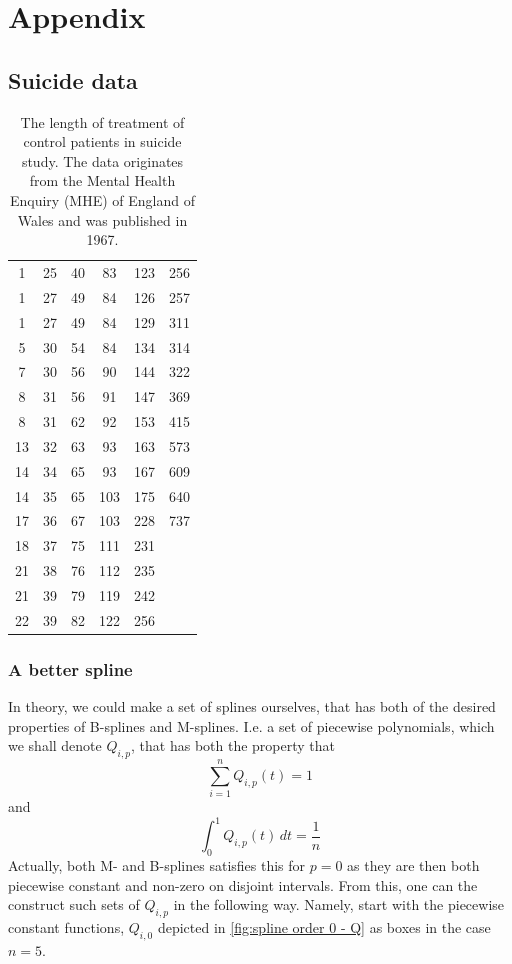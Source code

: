 \documentclass[../Thesis.tex]{subfiles}
\begin{document}
\chapter{Appendix}

\section{Suicide data}
\begin{table}[H]
    \centering
    \begin{tabular}{cccccc}
1 & 25 & 40 & 83 & 123 & 256 \\
1 & 27 & 49 & 84 & 126 & 257 \\
1 & 27 & 49 & 84 & 129 & 311 \\
5 & 30 & 54 & 84 & 134 & 314 \\
7 & 30 & 56 & 90 & 144 & 322 \\
8 & 31 & 56 & 91 & 147 & 369 \\
8 & 31 & 62 & 92 & 153 & 415 \\
13 & 32 & 63 & 93 & 163 & 573 \\
14 & 34 & 65 & 93 & 167 & 609 \\
14 & 35 & 65 & 103 & 175 & 640 \\
17 & 36 & 67 & 103 & 228 & 737 \\
18 & 37 & 75 & 111 & 231 \\
21 & 38 & 76 & 112 & 235 \\
21 & 39 & 79 & 119 & 242 \\
22 & 39 & 82 & 122 & 256
    \end{tabular}
    \caption{The length of treatment of control patients in suicide study. The data originates from the Mental Health Enquiry (MHE) of England of Wales and was published in 1967.}
    \label{tab:suicide data}
\end{table}

\newpage


\subsection{A better spline}\label{sec:A family of better splines for Copula entropy estimation}
In theory, we could make a set of splines ourselves, that has both of the desired properties of B-splines and M-splines. I.e. a set of piecewise polynomials, which we shall denote $Q_{i,p}$, that has both the property that
$$\sum_{i = 1}^n Q_{i,p} (t) = 1$$
and
$$\int_{0}^{1} Q_{i,p} (t) \, dt = \frac{1}{n} $$
Actually, both M- and B-splines satisfies this for $p = 0$ as they are then both piecewise constant and non-zero on disjoint intervals. From this, one can the construct such sets of $Q_{i,p}$ in the following way. Namely, start with the piecewise constant functions, $Q_{i,0}$ depicted in \autoref{fig:spline order 0 - Q} as boxes in the case $n = 5$.
\end{document}
